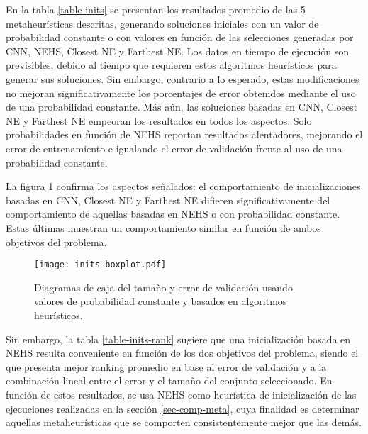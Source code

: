 En la tabla \ref{table-inits} se presentan los resultados promedio de las 5 metaheurísticas descritas, generando soluciones iniciales con un valor de probabilidad constante o con valores en función de las selecciones generadas por CNN, NEHS, Closest NE y Farthest NE. Los datos en tiempo de ejecución son previsibles, debido al tiempo que requieren estos algoritmos heurísticos para generar sus soluciones. Sin embargo, contrario a lo esperado, estas modificaciones no mejoran significativamente los porcentajes de error obtenidos mediante el uso de una probabilidad constante. Más aún, las soluciones basadas en CNN, Closest NE y Farthest NE empeoran los resultados en todos los aspectos. Solo probabilidades en función de NEHS reportan resultados alentadores, mejorando el error de entrenamiento e igualando el error de validación frente al uso de una probabilidad constante.

La figura \ref{fig-inits} confirma los aspectos señalados: el comportamiento de inicializaciones basadas en CNN, Closest NE y Farthest NE difieren significativamente del comportamiento de aquellas basadas en NEHS o con probabilidad constante. Estas últimas muestran un comportamiento similar en función de ambos objetivos del problema.

\begin{figure}[h!]
\centering
\texttt{[image: inits-boxplot.pdf]}
\caption[Tamaño y error de validación usando algoritmos heurísticos]{Diagramas de caja del tamaño y error de validación usando\\valores de probabilidad constante y basados en algoritmos heurísticos.}
\label{fig-inits}
\end{figure}

Sin embargo, la tabla \ref{table-inits-rank} sugiere que una inicialización basada en NEHS resulta conveniente en función de los dos objetivos del problema, siendo el que presenta mejor ranking promedio en base al error de validación y a la combinación lineal entre el error y el tamaño del conjunto seleccionado. En función de estos resultados, se usa NEHS como heurística de inicialización de las ejecuciones realizadas en la sección \ref{sec-comp-meta}, cuya finalidad es determinar aquellas metaheurísticas que se comporten consistentemente mejor que las demás.

